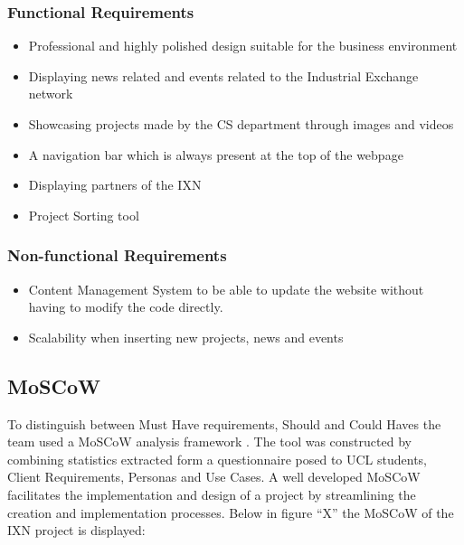 \hypertarget{functional-requirements}{%
\subsubsection{Functional Requirements}\label{functional-requirements}}

\begin{itemize}
\tightlist
\item
  Professional and highly polished design suitable for the business
  environment
\item
  Displaying news related and events related to the Industrial Exchange
  network
\item
  Showcasing projects made by the CS department through images and
  videos
\item
  A navigation bar which is always present at the top of the webpage
\item
  Displaying partners of the IXN
\item
  Project Sorting tool
\end{itemize}

\hypertarget{non-functional-requirements}{%
\subsubsection{Non-functional
Requirements}\label{non-functional-requirements}}

\begin{itemize}
\tightlist
\item
  Content Management System to be able to update the website without
  having to modify the code directly.
\item
  Scalability when inserting new projects, news and events
\end{itemize}

\hypertarget{moscow}{%
\subsection{MoSCoW}\label{moscow}}

To distinguish between Must Have requirements, Should and Could Haves
the team used a MoSCoW analysis framework \cite{g4}. The tool was
constructed by combining statistics extracted form a questionnaire posed
to UCL students, Client Requirements, Personas and Use Cases. A well
developed MoSCoW facilitates the implementation and design of a project
by streamlining the creation and implementation processes. Below in
figure ``X'' the MoSCoW of the IXN project is displayed:

